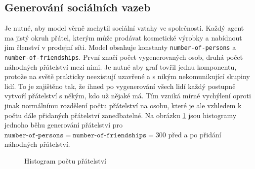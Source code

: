 \documentclass[a4wide,12pt]{report}
\begin{document}
\subsection{Generování sociálních vazeb}
Je nutné, aby model věrně zachytil sociální vztahy ve společnosti. Každý agent ma jistý okruh přátel, kterým může prodávat kosmetické výrobky a nabídnout jim členství v prodejní síti. Model obsahuje konstanty \texttt{number-of-persons} a \texttt{number-of-friendships}. První značí počet vygenerovaných osob, druhá počet náhodných přátelství mezi nimi. Je nutné aby graf tovřil jednu komponentu, protože na světě prakticky neexistují uzavřené a s nikým nekomunikující skupiny lidí. To je zajištěno tak, že ihned po vygenerování všech lidí každý postupně vytvoří přátelství s někým, kdo už nějaké má. Tím vzniká mírné vychýlení oproti jinak normálnímu rozdělení počtu přátelství na osobu, které je ale vzhledem k počtu dále přidaných přátelství zanedbatelné. Na obrázku \ref{fig:hist_fr} jsou histogramy jednoho běhu generování přátelství pro $\texttt{number-of-persons}=\texttt{number-of-friendships}=300$ před a po přidání náhodných přátelství.\\
\begin{figure}[h]
  \centering
  \caption{Histogram počtu přátelství}
  \label{fig:hist_fr}
\end{figure}
\end{document}
